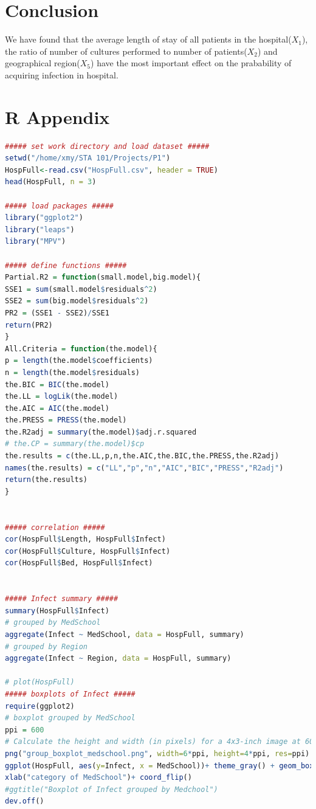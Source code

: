 \documentclass[a4paper,11pt,onecolumn,twoside]{article}
\begin{document}
\section{Conclusion}
We have found that the average length of stay of all patients in the hospital($X_1$), the ratio of number of cultures performed to number of patients($X_2$) and geographical region($X_5$) have the most important effect on the prabability of acquiring infection in hospital.
\newpage
\section*{R Appendix}				
\begin{lstlisting}[language=R,caption={R script for Project 1}] 
##### set work directory and load dataset ##### 
setwd("/home/xmy/STA 101/Projects/P1")
HospFull<-read.csv("HospFull.csv", header = TRUE)
head(HospFull, n = 3)

##### load packages #####
library("ggplot2")
library("leaps")
library("MPV")

##### define functions #####
Partial.R2 = function(small.model,big.model){
SSE1 = sum(small.model$residuals^2)
SSE2 = sum(big.model$residuals^2)
PR2 = (SSE1 - SSE2)/SSE1
return(PR2)
}
All.Criteria = function(the.model){
p = length(the.model$coefficients)
n = length(the.model$residuals)
the.BIC = BIC(the.model)
the.LL = logLik(the.model)
the.AIC = AIC(the.model)
the.PRESS = PRESS(the.model)
the.R2adj = summary(the.model)$adj.r.squared
# the.CP = summary(the.model)$cp
the.results = c(the.LL,p,n,the.AIC,the.BIC,the.PRESS,the.R2adj)
names(the.results) = c("LL","p","n","AIC","BIC","PRESS","R2adj")
return(the.results)
}


##### correlation #####
cor(HospFull$Length, HospFull$Infect)
cor(HospFull$Culture, HospFull$Infect)
cor(HospFull$Bed, HospFull$Infect)


##### Infect summary #####
summary(HospFull$Infect)
# grouped by MedSchool
aggregate(Infect ~ MedSchool, data = HospFull, summary)
# grouped by Region
aggregate(Infect ~ Region, data = HospFull, summary)

# plot(HospFull)
##### boxplots of Infect #####
require(ggplot2)
# boxplot grouped by MedSchool
ppi = 600
# Calculate the height and width (in pixels) for a 4x3-inch image at 600 ppi
png("group_boxplot_medschool.png", width=6*ppi, height=4*ppi, res=ppi)
ggplot(HospFull, aes(y=Infect, x = MedSchool))+ theme_gray() + geom_boxplot() + ylab("Probability of acquiring infection in hospital") + 
xlab("category of MedSchool")+ coord_flip() 
#ggtitle("Boxplot of Infect grouped by Medchool") 
dev.off()


\end{lstlisting}
\end{document}
